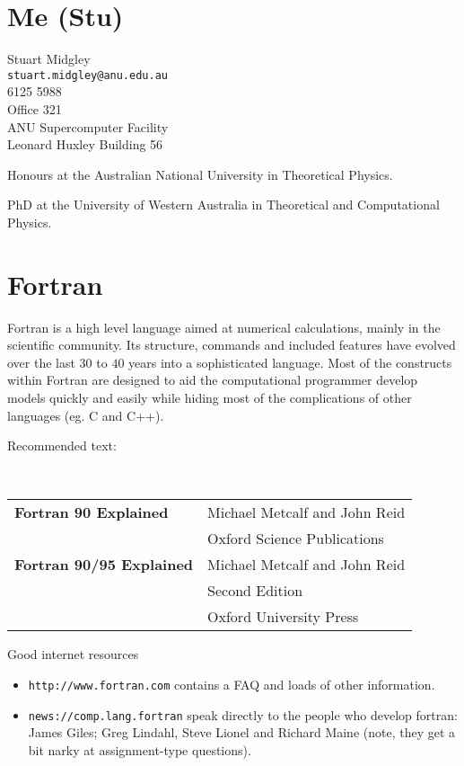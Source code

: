 \documentclass[12pt,a4paper,oneside,openany]{report}
\newcommand{\code}[1]{\texttt{#1}}
\begin{document}
\section*{Me (Stu)}

\hspace{2cm}\begin{minipage}{10cm}
Stuart Midgley \\
\code{stuart.midgley@anu.edu.au} \\
6125 5988\\
Office 321 \\
ANU Supercomputer Facility\\
Leonard Huxley Building 56
\end{minipage}

Honours at the Australian National University in Theoretical Physics.

PhD at the University of Western Australia in Theoretical and Computational Physics.

\section*{Fortran}

Fortran is a high level language aimed at numerical calculations, mainly in the scientific community.  Its structure, commands and included features have evolved over the last $30$ to $40$ years into a sophisticated language.  Most of the constructs within Fortran are designed to aid the computational programmer develop models quickly and easily while hiding most of the complications of other languages (eg. C and C++).

Recommended text:

\ \hspace{1cm}
\begin{tabular}[t]{ll}
\textbf{Fortran 90 Explained} & Michael Metcalf and John Reid \\
 & Oxford Science Publications \\
\textbf{Fortran 90/95 Explained} & Michael Metcalf and John Reid \\
 & Second Edition \\
 & Oxford University Press
\end{tabular}

Good internet resources
\begin{itemize}
\item \code{http://www.fortran.com} contains a FAQ and loads of other information.
\item \code{news://comp.lang.fortran} speak directly to the people who develop fortran: James Giles; Greg Lindahl, Steve Lionel and Richard Maine (note, they get a bit narky at assignment-type questions).
\end{itemize}
\end{document}
